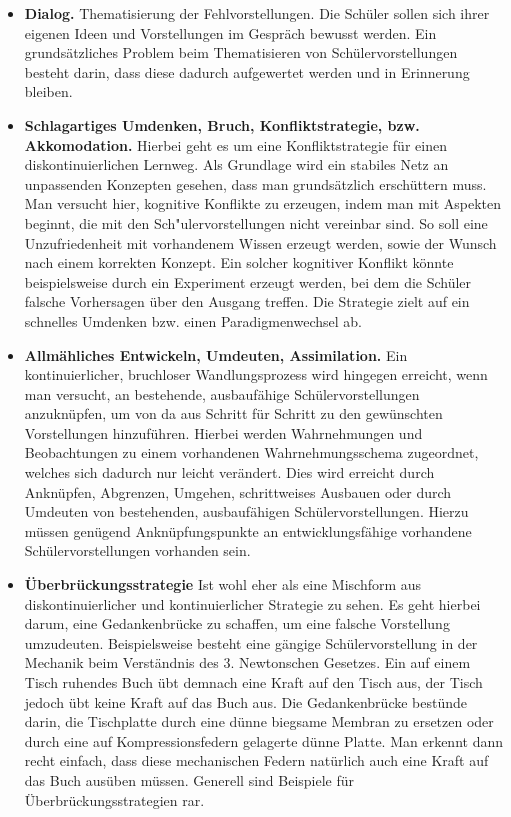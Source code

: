 \begin{itemize}
\item \textbf{Dialog.} Thematisierung der Fehlvorstellungen. Die Schüler sollen sich ihrer eigenen Ideen und Vorstellungen im Gespr{\"a}ch bewusst werden.  Ein grunds{\"a}tzliches Problem beim Thematisieren von Sch\"{u}lervorstellungen besteht darin, dass diese dadurch aufgewertet werden und in Erinnerung bleiben. 


\item \textbf{Schlagartiges Umdenken, Bruch, Konfliktstrategie, bzw. Akkomodation.} Hierbei geht es um eine Konfliktstrategie f{\"u}r einen diskontinuierlichen Lernweg. Als Grundlage wird ein stabiles Netz an unpassenden Konzepten gesehen, dass man grunds{\"a}tzlich ersch{\"u}ttern muss. Man versucht hier, kognitive Konflikte zu erzeugen, indem man mit Aspekten beginnt, die mit den Sch{"u}lervorstellungen nicht vereinbar sind. So soll eine Unzufriedenheit mit vorhandenem Wissen erzeugt werden, sowie der Wunsch nach einem korrekten Konzept.  Ein solcher kognitiver Konflikt k\"{o}nnte beispielsweise durch ein Experiment erzeugt werden, bei dem die Sch\"{u}ler falsche Vorhersagen \"{u}ber den Ausgang treffen. Die Strategie zielt auf ein schnelles Umdenken bzw. einen Paradigmenwechsel ab. 

\item \textbf{Allm\"{a}hliches Entwickeln, Umdeuten, Assimilation.}  Ein kontinuierlicher, bruchloser Wandlungsprozess wird hingegen erreicht, wenn man versucht, an bestehende, ausbauf\"{a}hige Sch\"{u}lervorstellungen anzukn\"{u}pfen, um von da aus Schritt f\"{u}r Schritt zu den gew\"{u}nschten Vorstellungen hinzuf\"{u}hren. Hierbei werden Wahrnehmungen und Beobachtungen zu einem vorhandenen Wahrnehmungsschema zugeordnet, welches sich dadurch nur leicht ver\"{a}ndert. Dies wird erreicht durch Ankn\"{u}pfen, Abgrenzen, Umgehen, schrittweises Ausbauen oder durch Umdeuten von bestehenden, ausbauf\"{a}higen  Sch\"{u}lervorstellungen. Hierzu m\"{u}ssen gen\"{u}gend Ankn\"{u}pfungspunkte an entwicklungsf\"{a}hige vorhandene Sch\"{u}lervorstellungen vorhanden sein. 

\item \textbf{{\"U}berbr{\"u}ckungsstrategie} Ist wohl eher als eine Mischform aus diskontinuierlicher und kontinuierlicher Strategie zu sehen. Es geht hierbei darum, eine Gedankenbr\"{u}cke zu schaffen, um eine falsche Vorstellung umzudeuten. Beispielsweise besteht eine g\"{a}ngige Sch\"{u}lervorstellung in der Mechanik beim Verst\"{a}ndnis des 3. Newtonschen Gesetzes. Ein auf einem Tisch ruhendes Buch \"{u}bt demnach eine Kraft auf den Tisch aus, der Tisch jedoch \"{u}bt keine Kraft auf das Buch aus. Die Gedankenbr\"{u}cke best\"{u}nde darin, die Tischplatte durch eine d\"{u}nne biegsame Membran zu ersetzen oder durch eine auf Kompressionsfedern gelagerte d\"{u}nne Platte. Man erkennt dann recht einfach, dass diese mechanischen Federn nat\"{u}rlich auch eine Kraft auf das Buch aus\"{u}ben m\"{u}ssen. Generell sind Beispiele f\"{u}r \"{U}berbr{\"u}ckungsstrategien rar.
\end{itemize}

